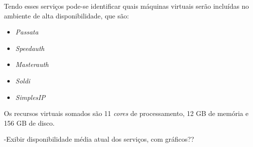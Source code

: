 Tendo esses serviços pode-se identificar quais máquinas virtuais serão incluídas no ambiente de alta disponibilidade, que são:
\begin{itemize}
 \item \textit{Passata}
 \item \textit{Speedauth}
 \item \textit{Masterauth}
 \item \textit{Soldi}
 \item \textit{SimplesIP}
\end{itemize}

Os recursos virtuais somados são 11 \textit{cores} de processamento, 12 GB de memória e 156 GB de disco.

-Exibir disponibilidade média atual dos serviços, com gráficos??




